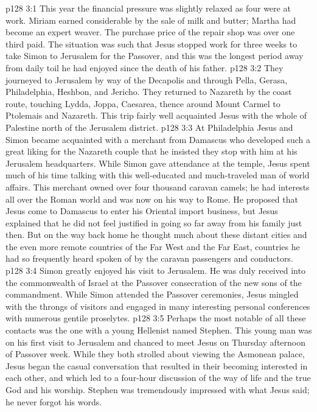 \vs p128 3:1 This year the financial pressure was slightly relaxed as four were at work. Miriam earned considerable by the sale of milk and butter; Martha had become an expert weaver. The purchase price of the repair shop was over one third paid. The situation was such that Jesus stopped work for three weeks to take Simon to Jerusalem for the Passover, and this was the longest period away from daily toil he had enjoyed since the death of his father.
\vs p128 3:2 They journeyed to Jerusalem by way of the Decapolis and through Pella, Gerasa, Philadelphia, Heshbon, and Jericho. They returned to Nazareth by the coast route, touching Lydda, Joppa, Caesarea, thence around Mount Carmel to Ptolemais and Nazareth. This trip fairly well acquainted Jesus with the whole of Palestine north of the Jerusalem district.
\vs p128 3:3 At Philadelphia Jesus and Simon became acquainted with a merchant from Damascus who developed such a great liking for the Nazareth couple that he insisted they stop with him at his Jerusalem headquarters. While Simon gave attendance at the temple, Jesus spent much of his time talking with this well\hyp{}educated and much\hyp{}traveled man of world affairs. This merchant owned over four thousand caravan camels; he had interests all over the Roman world and was now on his way to Rome. He proposed that Jesus come to Damascus to enter his Oriental import business, but Jesus explained that he did not feel justified in going so far away from his family just then. But on the way back home he thought much about these distant cities and the even more remote countries of the Far West and the Far East, countries he had so frequently heard spoken of by the caravan passengers and conductors.
\vs p128 3:4 Simon greatly enjoyed his visit to Jerusalem. He was duly received into the commonwealth of Israel at the Passover consecration of the new sons of the commandment. While Simon attended the Passover ceremonies, Jesus mingled with the throngs of visitors and engaged in many interesting personal conferences with numerous gentile proselytes.
\vs p128 3:5 Perhaps the most notable of all these contacts was the one with a young Hellenist named Stephen. This young man was on his first visit to Jerusalem and chanced to meet Jesus on Thursday afternoon of Passover week. While they both strolled about viewing the Asmonean palace, Jesus began the casual conversation that resulted in their becoming interested in each other, and which led to a four\hyp{}hour discussion of the way of life and the true God and his worship. Stephen was tremendously impressed with what Jesus said; he never forgot his words.
